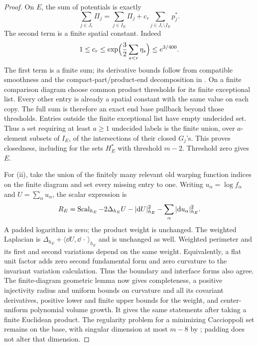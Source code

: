 \begin{proof}
On $E$, the sum of potentials is exactly
\begin{equation}\label{countable:potential-sum}
 \sum_{j\in J_r}\Pi_j
 =\sum_{j\in I_E}\Pi_j+c_r\sum_{j\in J_r\setminus I_E}p_j^*.
\end{equation}
The second term is a finite spatial constant. Indeed
\[
 1\le c_r\le\exp\Bigl(\frac32\sum_{s<r}\eta_s\Bigr)
 \le e^{3/400}.
\]
The first term is a finite sum; its derivative bounds follow from
compatible smoothness and the compact-part/product-end decomposition
in . On a finite comparison diagram choose common
product thresholds for its finite exceptional list. Every other entry is already a spatial
constant with the same value on each copy. The full sum is therefore
an exact end base pullback beyond those thresholds. Entries outside the finite exceptional list have empty undecided set. Thus a set requiring at least $a\ge1$ undecided labels
is the finite union, over $a$-element subsets of $I_E$, of the intersections of
their closed $G_j$'s. This proves closedness, including for the sets $H_E^*$
with threshold $m-2$. Threshold zero gives $E$.

For (ii), take the union of the finitely many relevant old warping function
indices on the finite diagram and set every missing entry to one.
Writing $u_\alpha=\log f_\alpha$ and $U=\sum_\alpha u_\alpha$, the
scalar expression is
\[
 R_E=\operatorname{Scal}_{h_E}-2\Delta_{h_E}U-|\mathrm d U|_{h_E}^2
                        -\sum_\alpha|\mathrm d u_\alpha|_{h_E}^2.
\]
A padded logarithm is zero; the product weight is unchanged. The
weighted Laplacian is
$\Delta_{h_E}+\langle\dd U,\dd\,\cdot\,\rangle_{h_E}$ and is
unchanged as well. Weighted perimeter and its first and second
variations depend on the same weight. Equivalently, a flat unit
factor adds zero second fundamental form and zero curvature to the
invariant variation calculation. Thus the boundary and interface forms also
agree. The finite-diagram geometric lemma now gives completeness,
a positive injectivity radius and uniform bounds on curvature and all its covariant derivatives, positive lower and finite upper bounds for the
weight, and center-uniform polynomial volume growth. It gives the
same statements after taking a finite Euclidean product. The
regularity problem for a minimizing Caccioppoli set remains on the base, with
singular dimension at most $m-8$ by ; padding does not
alter that dimension.


\end{proof}
